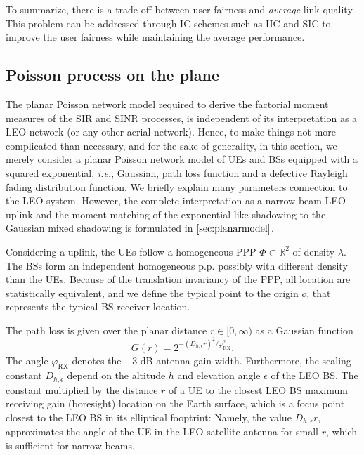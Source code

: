 \documentclass[lettersize,journal]{IEEEtran}
\newcommand{\R}{\mathbb{R}}
\begin{document}
To summarize, there is a trade-off between user fairness and \textit{average} link quality. This problem can be addressed through IC schemes such as IIC and SIC to improve the user fairness while maintaining the average performance.



\subsection{Poisson process on the plane}
\label{sec:gainprocess}

The planar Poisson network model required to derive the factorial moment measures of the SIR and SINR processes, is independent of its interpretation as a LEO network (or any other aerial network). Hence, to make things not more complicated than necessary, and for the sake of generality, in this section, we merely consider a planar Poisson network model of UEs and BSs equipped with a squared exponential, \textit{i.e.}, Gaussian, path loss function and a defective Rayleigh fading distribution function. We briefly explain many parameters connection to the LEO system. However, the complete interpretation as a narrow-beam LEO uplink and the moment matching of the exponential-like shadowing to the Gaussian mixed shadowing  is formulated  in $\ref{sec:planarmodel}$.

Considering a uplink, the UEs follow a homogeneous PPP $\Phi \subset \R^2$ of density $\lambda$. The BSs form an independent homogeneous p.p. possibly with different density than the UEs. Because of the translation invariancy of the PPP, all location are statistically equivalent, and we define the typical point to the origin $\textit{o}$, that represents the typical BS receiver location.



The path loss is given over the planar distance $r \in [0, \infty)$ as a Gaussian function
  \begin{equation}
    \label{eq:Gaussianantpat}
    G(r) = 2^{-(D_{h,\epsilon}r)^2 / \varphi_{\text{RX}}^2}.
  \end{equation}
  The angle $\varphi_{\text{RX}}$ denotes the $-3$ dB antenna gain width. Furthermore, the scaling constant $D_{h,\epsilon}$ depend on the altitude $h$ and elevation angle $\epsilon$ of the LEO BS. The constant multiplied by the distance $r$ of a UE to the closest LEO BS maximum receiving gain (boresight) location on the Earth surface, which is a focus point closest to the LEO BS in its elliptical fooptrint: Namely, the value $D_{h,\epsilon}r$, approximates the angle of the UE in the LEO satellite antenna for small $r$, which is sufficient for narrow beams. %
\end{document}
